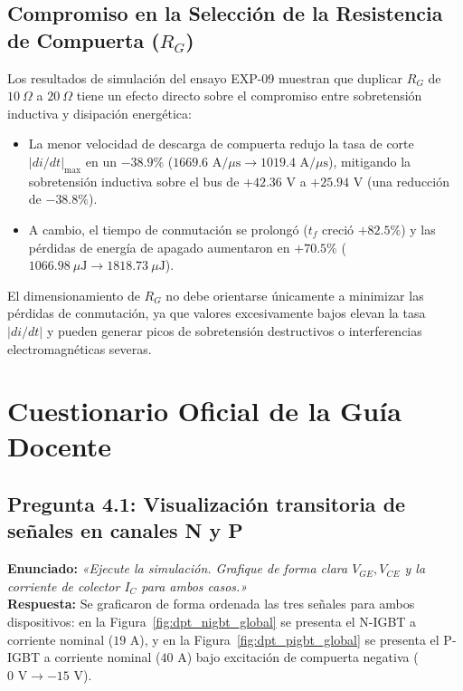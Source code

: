 \documentclass[11pt,a4paper]{article}
\begin{document}
\subsection{Compromiso en la Selección de la Resistencia de Compuerta ($R_G$)}
Los resultados de simulación del ensayo EXP-09 muestran que duplicar $R_G$ de $10\ \Omega$ a $20\ \Omega$ tiene un efecto directo sobre el compromiso entre sobretensión inductiva y disipación energética:
\begin{itemize}[leftmargin=*, noitemsep, topsep=2pt]
  \item La menor velocidad de descarga de compuerta redujo la tasa de corte $|di/dt|_{\text{max}}$ en un $-38.9\%$ ($1669.6\text{ A}/\mu\text{s} \to 1019.4\text{ A}/\mu\text{s}$), mitigando la sobretensión inductiva sobre el bus de $+42.36\text{ V}$ a $+25.94\text{ V}$ (una reducción de $-38.8\%$).
  \item A cambio, el tiempo de conmutación se prolongó ($t_f$ creció $+82.5\%$) y las pérdidas de energía de apagado aumentaron en $+70.5\%$ ($1066.98\ \mu\text{J} \to 1818.73\ \mu\text{J}$).
\end{itemize}
El dimensionamiento de $R_G$ no debe orientarse únicamente a minimizar las pérdidas de conmutación, ya que valores excesivamente bajos elevan la tasa $|di/dt|$ y pueden generar picos de sobretensión destructivos o interferencias electromagnéticas severas.

\FloatBarrier
\section{Cuestionario Oficial de la Guía Docente}

\subsection{Pregunta 4.1: Visualización transitoria de señales en canales N y P}
\textbf{Enunciado:} \textit{«Ejecute la simulación. Grafique de forma clara $V_{GE}, V_{CE}$ y la corriente de colector $I_C$ para ambos casos.»}\\
\textbf{Respuesta:} Se graficaron de forma ordenada las tres señales para ambos dispositivos: en la Figura~\ref{fig:dpt_nigbt_global} se presenta el N-IGBT a corriente nominal ($19\text{ A}$), y en la Figura~\ref{fig:dpt_pigbt_global} se presenta el P-IGBT a corriente nominal ($40\text{ A}$) bajo excitación de compuerta negativa ($0\text{ V} \to -15\text{ V}$).
\end{document}
